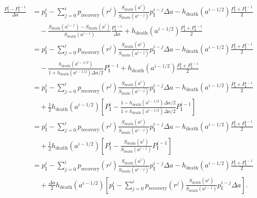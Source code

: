 \documentclass[12pt]{article}
\begin{document}
\begin{equation}
  \begin{split}
    \frac{P_{\mathrm{I}}^i - P_{\mathrm{I}}^{i - 1}}{\Delta a}
    &= p_{\mathrm{I}}^i
    - \sum_{j = 0}^i p_{\text{recovery}}(r^j)
    \frac{S_{\text{death}}(a^i)}{S_{\text{death}}(a^{i - j})}
    p_{\mathrm{I}}^{i - j} \Delta a
    - h_{\text{death}}(a^{i - 1 / 2})
    \frac{P_{\mathrm{I}}^i + P_{\mathrm{I}}^{i - 1}}{2}
    \\ & \quad {}
    - \frac{S_{\text{death}}(a^{i - 1}) - S_{\text{death}}(a^i)}
    {S_{\text{death}}(a^{i - 1})}
    \frac{P_{\mathrm{I}}^{i - 1}}{\Delta a}
    + h_{\text{death}}(a^{i - 1 / 2})
    \frac{P_{\mathrm{I}}^i + P_{\mathrm{I}}^{i - 1}}{2}
    \\
    &= p_{\mathrm{I}}^i
    - \sum_{j = 0}^i p_{\text{recovery}}(r^j)
    \frac{S_{\text{death}}(a^i)}{S_{\text{death}}(a^{i - j})}
    p_{\mathrm{I}}^{i - j} \Delta a
    - h_{\text{death}}(a^{i - 1 / 2})
    \frac{P_{\mathrm{I}}^i + P_{\mathrm{I}}^{i - 1}}{2}
    \\ & \quad {}
    - \frac{h_{\text{death}}(a^{i - 1 / 2})}
    {1 + h_{\text{death}}(a^{i - 1 / 2}) \Delta a / 2}
    P_{\mathrm{I}}^{i - 1}
    + h_{\text{death}}(a^{i - 1 / 2})
    \frac{P_{\mathrm{I}}^i + P_{\mathrm{I}}^{i - 1}}{2}
    \\
    &= p_{\mathrm{I}}^i
    - \sum_{j = 0}^i p_{\text{recovery}}(r^j)
    \frac{S_{\text{death}}(a^i)}{S_{\text{death}}(a^{i - j})}
    p_{\mathrm{I}}^{i - j} \Delta a
    - h_{\text{death}}(a^{i - 1 / 2})
    \frac{P_{\mathrm{I}}^i + P_{\mathrm{I}}^{i - 1}}{2}
    \\ & \quad {}
    + \frac{1}{2} h_{\text{death}}(a^{i - 1 / 2})
    \left[
      P_{\mathrm{I}}^i
      - \frac{1 - h_{\text{death}}(a^{i - 1 / 2}) \Delta a / 2}
      {1 + h_{\text{death}}(a^{i - 1 / 2}) \Delta a / 2}
      P_{\mathrm{I}}^{i - 1}
    \right]
    \\
    &= p_{\mathrm{I}}^i
    - \sum_{j = 0}^i p_{\text{recovery}}(r^j)
    \frac{S_{\text{death}}(a^i)}{S_{\text{death}}(a^{i - j})}
    p_{\mathrm{I}}^{i - j} \Delta a
    - h_{\text{death}}(a^{i - 1 / 2})
    \frac{P_{\mathrm{I}}^i + P_{\mathrm{I}}^{i - 1}}{2}
    \\ & \quad {}
    + \frac{1}{2} h_{\text{death}}(a^{i - 1 / 2})
    \left[
      P_{\mathrm{I}}^i
      - \frac{S_{\text{death}}(a^i)}{S_{\text{death}}(a^{i - 1})}
        P_{\mathrm{I}}^{i - 1}
    \right]
    \\
    &= p_{\mathrm{I}}^i
    - \sum_{j = 0}^i p_{\text{recovery}}(r^j)
    \frac{S_{\text{death}}(a^i)}{S_{\text{death}}(a^{i - j})}
    p_{\mathrm{I}}^{i - j} \Delta a
    - h_{\text{death}}(a^{i - 1 / 2})
    \frac{P_{\mathrm{I}}^i + P_{\mathrm{I}}^{i - 1}}{2}
    \\ & \quad {}
    + \frac{\Delta a}{2} h_{\text{death}}(a^{i - 1 / 2})
    \left[
      p_{\mathrm{I}}^i
      - \sum_{j = 0}^i p_{\text{recovery}}(r^j)
      \frac{S_{\text{death}}(a^i)}{S_{\text{death}}(a^{i - 1})}
      p_{\mathrm{I}}^{i - j} \Delta a
    \right].
  \end{split}
\end{equation}
\end{document}
